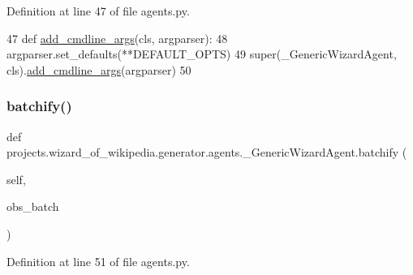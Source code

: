 Definition at line 47 of file agents.\+py.


\begin{DoxyCode}
47     \textcolor{keyword}{def }\hyperlink{namespaceparlai_1_1agents_1_1drqa_1_1config_a62fdd5554f1da6be0cba185271058320}{add\_cmdline\_args}(cls, argparser):
48         argparser.set\_defaults(**DEFAULT\_OPTS)
49         super(\_GenericWizardAgent, cls).\hyperlink{namespaceparlai_1_1agents_1_1drqa_1_1config_a62fdd5554f1da6be0cba185271058320}{add\_cmdline\_args}(argparser)
50 
\end{DoxyCode}
\mbox{\label{classprojects_1_1wizard__of__wikipedia_1_1generator_1_1agents_1_1__GenericWizardAgent_a898b6da1e93aa458966616f0208681fc}} 
\subsubsection{\texorpdfstring{batchify()}{batchify()}}
{\footnotesize\ttfamily def projects.\+wizard\+\_\+of\+\_\+wikipedia.\+generator.\+agents.\+\_\+\+Generic\+Wizard\+Agent.\+batchify (\begin{DoxyParamCaption}\item[{}]{self,  }\item[{}]{obs\+\_\+batch }\end{DoxyParamCaption})}



Definition at line 51 of file agents.\+py.


